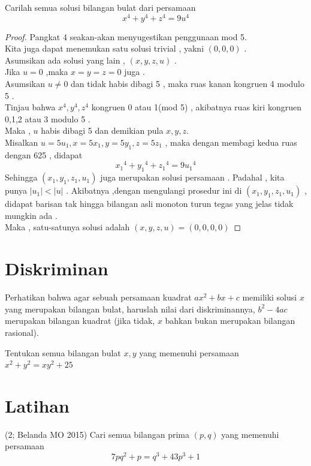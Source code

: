 \documentclass[11pt]{scrartcl}
\begin{document}
\begin{example}
    Carilah semua solusi bilangan bulat dari persamaan $$x^4+y^4+z^4=9u^4$$
\end{example}
\begin{proof}
    Pangkat 4 seakan-akan menyugestikan penggunaan mod 5. \\
    Kita juga dapat menemukan satu solusi trivial , yakni $(0,0,0)$ .\\
    Asumsikan ada solusi yang lain , $(x,y,z,u)$ .\\
    Jika $u=0$ ,maka $x=y=z=0$ juga .\\
    Asumsikan $u \neq 0$ dan tidak habis dibagi 5 , maka ruas kanan kongruen 4 modulo 5 . \\
    Tinjau bahwa $x^4,y^4,z^4$ kongruen 0 atau 1(mod 5) , akibatnya ruas kiri kongruen 0,1,2 atau 3 modulo 5 .\\
    Maka , $u$ habis dibagi 5 dan demikian pula $x,y,z$.\\
    Misalkan $u=5u_1 , x=5x_1 , y=5y_1 , z=5z_1$ , maka dengan membagi kedua ruas dengan 625 , didapat $${x_1}^4+{y_1}^4+{z_1}^4=9{u_1}^4$$
    Sehingga $(x_1,y_1,z_1,u_1)$ juga merupakan solusi persamaan . Padahal ,  kita punya $|u_1|<|u|$ . Akibatnya ,dengan mengulangi prosedur ini di $(x_1,y_1,z_1,u_1)$ , didapat barisan tak hingga bilangan asli monoton turun tegas yang jelas tidak mungkin ada . \\
    Maka , satu-satunya solusi adalah $(x,y,z,u)=(0,0,0,0)$
\end{proof}
    
\section{Diskriminan}
Perhatikan bahwa agar sebuah persamaan kuadrat $ax^2 + bx + c$ memiliki solusi $x$ yang merupakan bilangan bulat, haruslah nilai dari diskriminannya, $b^2 - 4ac$ merupakan bilangan kuadrat (jika tidak, $x$ bahkan bukan merupakan bilangan rasional). 

\begin{example}
    Tentukan semua bilangan bulat $x,y$ yang memenuhi persamaan $x^2+y^2=xy^2+25$
\end{example}
    
\section{Latihan}
\begin{problem}
    (2; Belanda MO 2015) Cari semua bilangan prima $(p,q)$ yang memenuhi persamaan \[7pq^2 + p = q^3 + 43p^3 + 1 \]
\end{problem}
\end{document}
